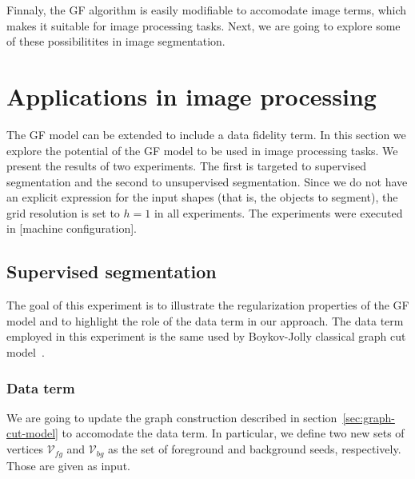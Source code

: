 \documentclass[smallextended]{svjour3}
\begin{document}
Finnaly, the GF algorithm is easily modifiable to accomodate image terms, which makes it suitable for image processing tasks. Next, we are going to explore some of these possibilitites in image segmentation.

\section{Applications in image processing}

The GF model can be extended to include a data fidelity term. In this section we explore the potential of the GF model to be used in image processing tasks. We present the results of two experiments. The first is targeted to supervised segmentation and the second to unsupervised segmentation. Since we do not have an explicit expression for the input shapes (that is, the objects to segment), the grid resolution is set to $h=1$ in all experiments. The experiments were executed in [machine configuration].


\subsection{Supervised segmentation}

The goal of this experiment is to illustrate the regularization properties of the GF model and to highlight the role of the data term in our approach. The data term employed in this experiment is the same used by Boykov-Jolly classical graph cut model~\cite{boykov01graphcut}. 

\subsubsection{Data term}
We are going to update the graph construction described in section~\ref{sec:graph-cut-model} to accomodate the data term. In particular, we define two new sets of vertices $\mathcal{V}_{fg}$ and $\mathcal{V}_{bg}$ as the set of foreground and background seeds, respectively. Those are given as input.
\end{document}
